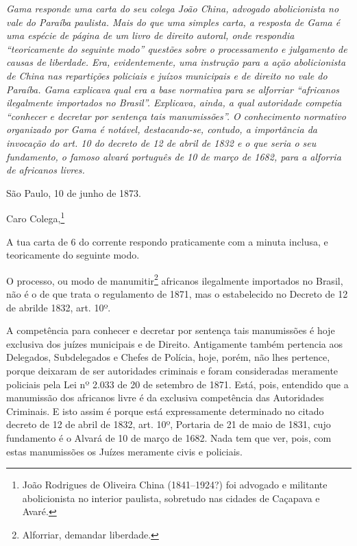 \begin{didascalia}
\emph{Gama responde uma carta do seu colega João China, advogado
abolicionista no vale do Paraíba paulista. Mais do que uma simples
carta, a resposta de Gama é uma espécie de página de um livro de direito
autoral, onde respondia ``teoricamente do seguinte modo'' questões sobre o
processamento e julgamento de causas de liberdade. Era, evidentemente,
uma instrução para a ação abolicionista de China nas repartições
policiais e juízos municipais e de direito no vale do Paraíba. Gama
explicava qual era a base normativa para se alforriar ``africanos
ilegalmente importados no Brasil''. Explicava, ainda, a qual autoridade
competia ``conhecer e decretar por sentença tais manumissões''. O
conhecimento normativo organizado por Gama é notável, destacando-se,
contudo, a importância da invocação do art. 10 do decreto de 12 de abril de 1832
e o que seria o seu fundamento, o famoso alvará português de 10 de março de 1682,
para a alforria de africanos livres.}
\end{didascalia}


São Paulo, 10 de junho de 1873.

Caro Colega,\footnote{ João Rodrigues de Oliveira China (1841--1924?)
  foi advogado e militante abolicionista no interior paulista, sobretudo
  nas cidades de Caçapava e Avaré.}

A tua carta de 6 do corrente respondo praticamente com a minuta inclusa,
e teoricamente do seguinte modo.

O processo, ou modo de manumitir\footnote{ Alforriar, demandar
  liberdade.} africanos ilegalmente importados no Brasil, não é o de que
trata o regulamento de 1871, mas o estabelecido no Decreto de 12 de
abrilde 1832, art. 10º.

A competência para conhecer e decretar por sentença tais manumissões é
hoje exclusiva dos juízes municipais e de Direito. Antigamente também
pertencia aos Delegados, Subdelegados e Chefes de Polícia, hoje, porém,
não lhes pertence, porque deixaram de ser autoridades criminais e foram
consideradas meramente policiais pela Lei nº 2.033 de 20 de setembro de
1871. Está, pois, entendido que a manumissão dos africanos livre é da
exclusiva competência das {Autoridades Criminais}. E isto assim é porque
está expressamente determinado no citado decreto de 12 de abril de 1832,
art. 10º, Portaria de 21 de maio de 1831, cujo fundamento é o Alvará de
10 de março de 1682. Nada tem que ver, pois, com estas manumissões os
Juízes meramente civis e policiais.

